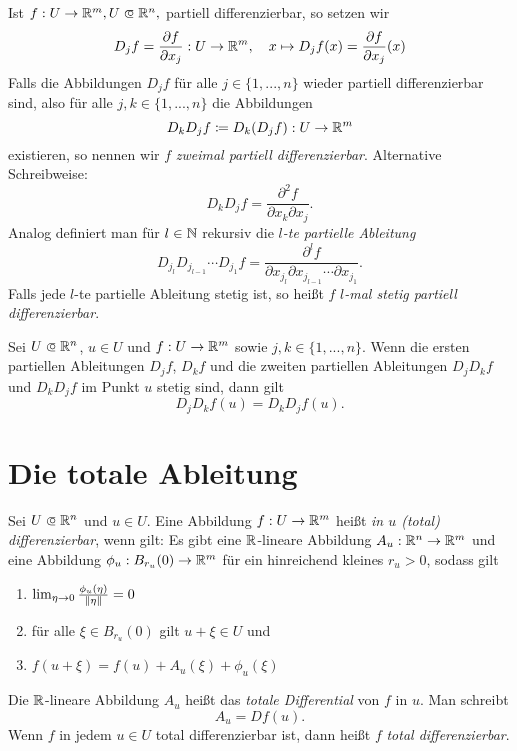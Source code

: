 \documentclass{cheat-sheet}
\begin{document}
\begin{defn}
  Ist $f : U \to \R^m, U \opn \R^n,$ partiell differenzierbar, so setzen wir
  \[ D_j f = \frac{\partial f}{\partial x_j} : U \to \mathbb{R}^m,\quad x \mapsto D_j f(x) = \frac{\partial f}{\partial x_j}(x) \]
  Falls die Abbildungen $D_j f$ für alle $j \in \{ 1, ..., n \}$ wieder partiell differenzierbar sind, also für alle $j, k \in \{ 1, ..., n \}$ die Abbildungen
  \[ D_k D_j f \coloneqq D_k (D_j f) : U \to \mathbb{R}^m \]
  existieren, so nennen wir $f$ \emph{zweimal partiell differenzierbar}. Alternative Schreibweise:
  \[ D_k D_j f = \frac{\partial^2 f}{\partial x_k \partial x_j}. \]
  Analog definiert man für $l \in \mathbb{N}$ rekursiv die \emph{$l$-te partielle Ableitung}
  \[ D_{j_l} D_{j_{l-1}} \cdots D_{j_1} f = \frac{\partial^l f}{\partial x_{j_l} \partial x_{j_{l-1}} \cdots \partial x_{j_1}}. \]
  Falls jede $l$-te partielle Ableitung stetig ist, so heißt $f$ \emph{$l$-mal stetig partiell differenzierbar}.
\end{defn}

\begin{samepage}

\begin{satz}
  Sei $U \opn \R^n$, $u \in U$ und $f : U \to \mathbb{R}^m$ sowie $j, k \in \{ 1, ..., n \}$. Wenn die ersten partiellen Ableitungen $D_j f$, $D_k f$ und die zweiten partiellen Ableitungen $D_j D_k f$ und $D_k D_j f$ im Punkt $u$ stetig sind, dann gilt
  \[ D_j D_k f(u) = D_k D_j f(u). \]
\end{satz}



\section{Die totale Ableitung}

\end{samepage}

\begin{defn}
  Sei $U \opn \R^n$ und $u \in U$. Eine Abbildung $f : U \to \mathbb{R}^m$ heißt \emph{in $u$ (total) differenzierbar}, wenn gilt: Es gibt eine $\mathbb{R}$-lineare Abbildung $A_u : \mathbb{R}^n \to \mathbb{R}^m$ und eine Abbildung $\phi_u : B_{r_u}(0) \to \mathbb{R}^m$ für ein hinreichend kleines $r_u > 0$, sodass gilt
  \begin{enumerate}
    \item $\lim_{\eta \to 0} \tfrac{ \phi_u(\eta) }{ \lVert\eta\rVert } = 0$
    \item für alle $\xi \in B_{r_u}(0)$ gilt $u + \xi \in U$ und
    \item $f(u + \xi) = f(u) + A_u(\xi) + \phi_u(\xi)$
  \end{enumerate}
  Die $\mathbb{R}$-lineare Abbildung $A_u$ heißt das \emph{totale Differential} von $f$ in $u$. Man schreibt
  \[ A_u = D f(u). \]
  Wenn $f$ in jedem $u \in U$ total differenzierbar ist, dann heißt $f$ \emph{total differenzierbar}.
\end{defn}
\end{document}
